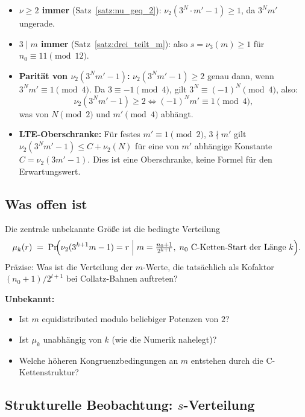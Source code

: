 \documentclass[12pt,a4paper]{article}
\newcommand{\vii}{\nu_2}
\newcommand{\viii}{\nu_3}
\begin{document}
\begin{itemize}[leftmargin=2em, itemsep=4pt]
  \item \textbf{$\nu \geq 2$ immer} (Satz~\ref{satz:nu_geq_2}):
        $\vii(3^N \cdot m' - 1) \geq 1$, da $3^N m'$ ungerade.
  \item \textbf{$3 \mid m$ immer} (Satz~\ref{satz:drei_teilt_m}):
        also $s = \viii(m) \geq 1$ für $n_0 \equiv 11 \pmod{12}$.
  \item \textbf{Parität von $\vii(3^N m' - 1)$:}
        $\vii(3^N m' - 1) \geq 2$ genau dann, wenn $3^N m' \equiv 1 \pmod 4$.
        Da $3 \equiv -1 \pmod 4$, gilt $3^N \equiv (-1)^N \pmod 4$, also:
        \[
          \vii(3^N m' - 1) \geq 2 \iff (-1)^N m' \equiv 1 \pmod 4,
        \]
        was von $N \pmod 2$ und $m' \pmod 4$ abhängt.
  \item \textbf{LTE-Oberschranke:}
        Für festes $m' \equiv 1 \pmod 2$, $3 \nmid m'$ gilt
        $\vii(3^N m' - 1) \leq C + \vii(N)$ für eine von $m'$ abhängige
        Konstante $C = \vii(3m'-1)$. Dies ist eine Oberschranke,
        keine Formel für den Erwartungswert.
\end{itemize}

\subsection{Was offen ist}

\begin{tcolorbox}[lücke, title={Offene Frage: Verteilung $\mu_k$}]
Die zentrale unbekannte Größe ist die bedingte Verteilung
\[
  \mu_k(r) \;=\; \Pr\!\Bigl(\vii(3^{k+1}m - 1) = r \;\Big|\;
  m = \tfrac{n_0 + 1}{2^{k+1}},\; n_0 \text{ C-Ketten-Start der Länge } k\Bigr).
\]
Präzise: Was ist die Verteilung der $m$-Werte, die tatsächlich als
Kofaktor $(n_0 + 1)/2^{l+1}$ bei Collatz-Bahnen auftreten?

\medskip
\textbf{Unbekannt:}
\begin{itemize}[noitemsep]
  \item Ist $m$ equidistributed modulo beliebiger Potenzen von $2$?
  \item Ist $\mu_k$ unabhängig von $k$ (wie die Numerik nahelegt)?
  \item Welche höheren Kongruenzbedingungen an $m$ entstehen durch
        die C-Kettenstruktur?
\end{itemize}
\end{tcolorbox}

\subsection{Strukturelle Beobachtung: \texorpdfstring{$s$}{s}-Verteilung}
\end{document}
